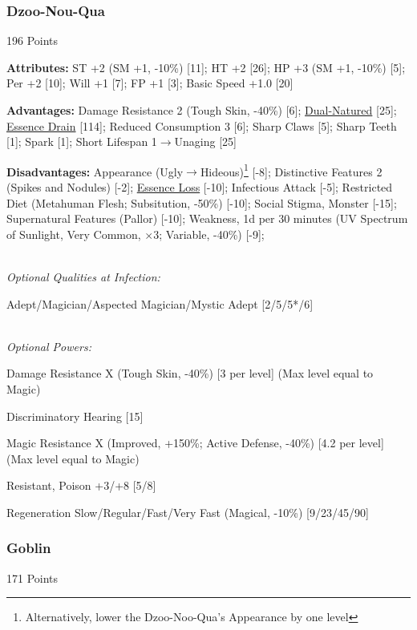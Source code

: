 \begin{multicols*}{3}
	\subsubsection{Dzoo-Nou-Qua}\label{dzoo-noo-qua}
	\begin{flushright}
		196 Points
	\end{flushright}
	
	\textbf{Attributes:}
	ST +2 (SM +1, -10\%) [11]; HT +2 [26]; HP +3 (SM +1, -10\%) [5]; Per +2 [10]; Will +1 [7]; FP +1 [3]; Basic Speed +1.0 [20]
	
	\textbf{Advantages:}
	Damage Resistance 2 (Tough Skin, -40\%) [6]; \hyperref[dual_natured]{Dual-Natured} [25];  \hyperref[essence_drain]{Essence Drain} [114]; Reduced Consumption 3 [6]; Sharp Claws [5]; Sharp Teeth [1]; Spark [1]; Short Lifespan 1$\rightarrow$Unaging [25]
	
	\textbf{Disadvantages:}	
	Appearance (Ugly$\rightarrow$Hideous)\footnote{Alternatively, lower the Dzoo-Noo-Qua's Appearance by one level} [-8]; Distinctive Features 2 (Spikes and Nodules) [-2]; \hyperref[essence_loss]{Essence Loss} [-10]; Infectious Attack [-5]; Restricted Diet (Metahuman Flesh; Subsitution, -50\%) [-10]; Social Stigma, Monster [-15]; Supernatural Features (Pallor) [-10]; Weakness, 1d per 30 minutes (UV Spectrum of Sunlight, Very Common, $\times$3; Variable, -40\%) [-9];
	
	\textit{\\Optional Qualities at Infection:}
	
	Adept/Magician/Aspected Magician/Mystic Adept [2/5/5*/6]
	
	\textit{\\Optional Powers:}
	
	Damage Resistance X (Tough Skin, -40\%) [3 per level] (Max level equal to Magic)
	
	Discriminatory Hearing [15]
		
	Magic Resistance X (Improved, +150\%; Active Defense, -40\%) [4.2 per level] (Max level equal to Magic)
	
	Resistant, Poison +3/+8 [5/8]
	
	Regeneration Slow/Regular/Fast/Very Fast (Magical, -10\%) [9/23/45/90]	

	\subsubsection{Goblin}\label{goblin}
	\begin{flushright}
		171 Points
	\end{flushright}


\end{multicols*}

